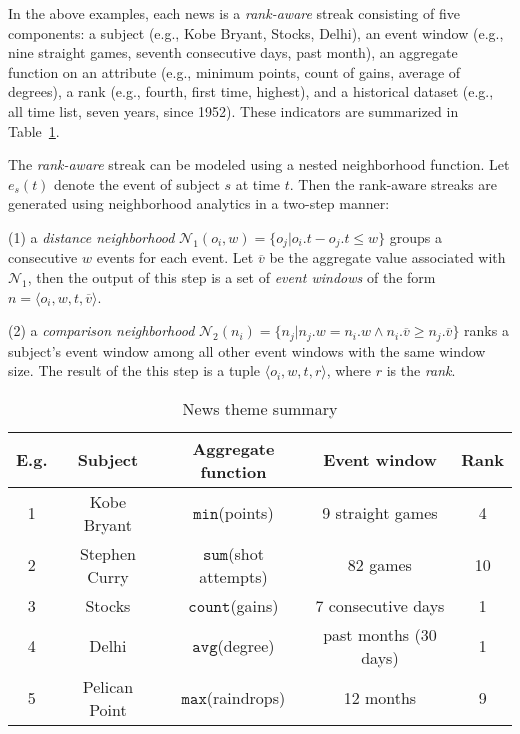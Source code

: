In the above examples, each news is a \emph{rank-aware} streak consisting of five components: a subject (e.g., Kobe Bryant, Stocks, Delhi), an event window (e.g., nine straight games, seventh consecutive days, past month), an aggregate function on an attribute
(e.g., minimum points, count of gains, average of degrees), a rank (e.g., fourth, first time, highest), and a
historical dataset (e.g., all time list, seven years, since 1952). These indicators are summarized in
Table~\ref{tbl:news-example}.

The \emph{rank-aware} streak can be modeled using a nested neighborhood function. 
Let $e_s(t)$ denote the event of subject $s$ at time $t$. Then the rank-aware streaks are generated using neighborhood analytics in a two-step manner: 

(1) a \emph{distance neighborhood} $\mathcal{N}_1(o_i,w)=\{o_j | o_i.t - o_j.t \leq w \}$ groups a consecutive $w$ events for each event. Let $\overline{v}$ be the aggregate value associated with $\mathcal{N}_1$, then the output of this step is a set of \emph{event windows} of the form  $n=\langle o_i, w, t, \overline{v} \rangle$.

(2) a \emph{comparison neighborhood} $\mathcal{N}_2(n_i) = \{n_j | n_j.w = n_i.w \wedge n_i.\overline{v} \geq n_j.\overline{v} \}$ ranks a subject's event window among all other event windows with the same window size. The result of the this step is a tuple $\langle o_i, w, t, r \rangle$, where $r$ is the \emph{rank}.





\begin{table}[h]
\centering
\begin{tabular}{|c|c|c|c|c|}
\hline
\textbf{E.g.} & \textbf{Subject} & \textbf{Aggregate function} & \textbf{Event window} & \textbf{Rank} \\
\hline
1 & Kobe Bryant &$\mathtt{min}$(points) & 9 straight games & 4 \\
\hline
2 & Stephen Curry &$\mathtt{sum}$(shot attempts) & 82 games & 10 \\
\hline
3 & Stocks &$\mathtt{count}$(gains) & 7 consecutive days & 1 \\
\hline
4 & Delhi &$\mathtt{avg}$(degree) & past months (30 days) & 1 \\
\hline
5 & Pelican Point &$\mathtt{max}$(raindrops) & 12 months & 9 \\
\hline
\end{tabular}
\caption{News theme summary}
\label{tbl:news-example}
\end{table}

